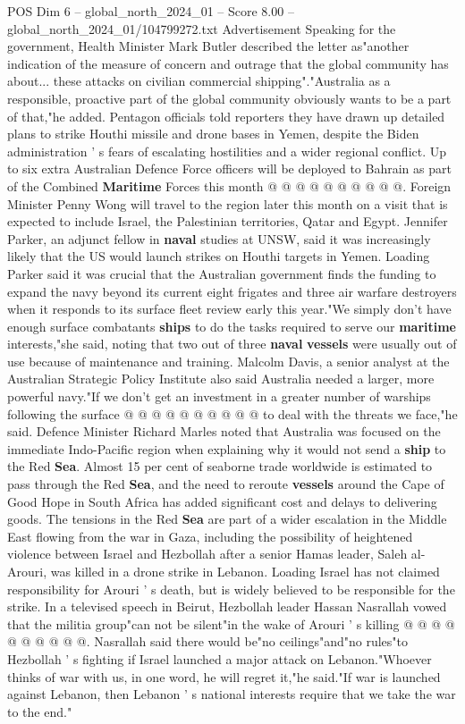 \begin{textsample}{POS Dim 6 – global\_north\_2024\_01 – Score 8.00 – global\_north\_2024\_01/104799272.txt}
Advertisement Speaking for the government, Health Minister Mark Butler described the letter as"another indication of the measure of concern and outrage that the global community has about... these attacks on civilian commercial shipping"."Australia as a responsible, proactive part of the global community obviously wants to be a part of that,"he added.
Pentagon officials told reporters they have drawn up detailed plans to strike Houthi missile and drone bases in Yemen, despite the Biden administration ' s fears of escalating hostilities and a wider regional conflict.
Up to six extra Australian Defence Force officers will be deployed to Bahrain as part of the Combined \textbf{Maritime} Forces this month @ @ @ @ @ @ @ @ @ @.
Foreign Minister Penny Wong will travel to the region later this month on a visit that is expected to include Israel, the Palestinian territories, Qatar and Egypt.
Jennifer Parker, an adjunct fellow in \textbf{naval} studies at UNSW, said it was increasingly likely that the US would launch strikes on Houthi targets in Yemen.
Loading Parker said it was crucial that the Australian government finds the funding to expand the navy beyond its current eight frigates and three air warfare destroyers when it responds to its surface fleet review early this year."We simply don't have enough surface combatants \textbf{ships} to do the tasks required to serve our \textbf{maritime} interests,"she said, noting that two out of three \textbf{naval} \textbf{vessels} were usually out of use because of maintenance and training.
Malcolm Davis, a senior analyst at the Australian Strategic Policy Institute also said Australia needed a larger, more powerful navy."If we don't get an investment in a greater number of warships following the surface @ @ @ @ @ @ @ @ @ @ to deal with the threats we face,"he said.
Defence Minister Richard Marles noted that Australia was focused on the immediate Indo-Pacific region when explaining why it would not send a \textbf{ship} to the Red \textbf{Sea}.
Almost 15 per cent of seaborne trade worldwide is estimated to pass through the Red \textbf{Sea}, and the need to reroute \textbf{vessels} around the Cape of Good Hope in South Africa has added significant cost and delays to delivering goods.
The tensions in the Red \textbf{Sea} are part of a wider escalation in the Middle East flowing from the war in Gaza, including the possibility of heightened violence between Israel and Hezbollah after a senior Hamas leader, Saleh al-Arouri, was killed in a drone strike in Lebanon.
Loading Israel has not claimed responsibility for Arouri ' s death, but is widely believed to be responsible for the strike.
In a televised speech in Beirut, Hezbollah leader Hassan Nasrallah vowed that the militia group"can not be silent"in the wake of Arouri ' s killing @ @ @ @ @ @ @ @ @ @.
Nasrallah said there would be"no ceilings"and"no rules"to Hezbollah ' s fighting if Israel launched a major attack on Lebanon."Whoever thinks of war with us, in one word, he will regret it,"he said."If war is launched against Lebanon, then Lebanon ' s national interests require that we take the war to the end."

\end{textsample}
